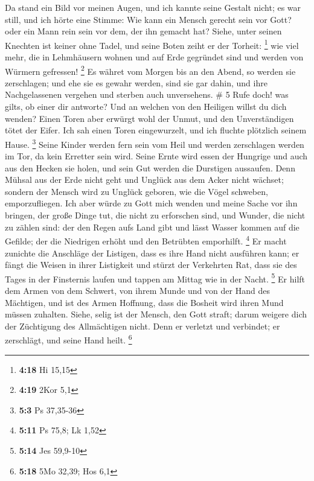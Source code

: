  Da stand ein Bild vor meinen Augen, und ich kannte seine
Gestalt nicht; es war still, und ich hörte eine Stimme: 
Wie kann ein Mensch gerecht sein vor Gott? oder ein Mann rein sein vor
dem, der ihn gemacht hat?  Siehe, unter seinen Knechten ist
keiner ohne Tadel, und seine Boten zeiht er der Torheit: \footnote{\textbf{4:18}
  Hi 15,15}  wie viel mehr, die in Lehmhäusern wohnen und
auf Erde gegründet sind und werden von Würmern gefressen! \footnote{\textbf{4:19}
  2Kor 5,1}  Es währet vom Morgen bis an den Abend, so
werden sie zerschlagen; und ehe sie es gewahr werden, sind sie gar
dahin,  und ihre Nachgelassenen vergehen und sterben auch
unversehens. \# 5  Rufe doch! was gilts, ob einer dir
antworte? Und an welchen von den Heiligen willst du dich wenden?
 Einen Toren aber erwürgt wohl der Unmut, und den
Unverständigen tötet der Eifer.  Ich sah einen Toren
eingewurzelt, und ich fluchte plötzlich seinem Hause. \footnote{\textbf{5:3}
  Ps 37,35-36}  Seine Kinder werden fern sein vom Heil und
werden zerschlagen werden im Tor, da kein Erretter sein wird.
 Seine Ernte wird essen der Hungrige und auch aus den Hecken
sie holen, und sein Gut werden die Durstigen aussaufen. 
Denn Mühsal aus der Erde nicht geht und Unglück aus dem Acker nicht
wächset;  sondern der Mensch wird zu Unglück geboren, wie
die Vögel schweben, emporzufliegen.  Ich aber würde zu Gott
mich wenden und meine Sache vor ihn bringen,  der große
Dinge tut, die nicht zu erforschen sind, und Wunder, die nicht zu zählen
sind:  der den Regen aufs Land gibt und lässt Wasser kommen
auf die Gefilde;  der die Niedrigen erhöht und den
Betrübten emporhilft. \footnote{\textbf{5:11} Ps 75,8; Lk 1,52}
 Er macht zunichte die Anschläge der Listigen, dass es ihre
Hand nicht ausführen kann;  er fängt die Weisen in ihrer
Listigkeit und stürzt der Verkehrten Rat,  dass sie des
Tages in der Finsternis laufen und tappen am Mittag wie in der Nacht.
\footnote{\textbf{5:14} Jes 59,9-10}  Er hilft dem Armen
von dem Schwert, von ihrem Munde und von der Hand des Mächtigen,
 und ist des Armen Hoffnung, dass die Bosheit wird ihren
Mund müssen zuhalten.  Siehe, selig ist der Mensch, den
Gott straft; darum weigere dich der Züchtigung des Allmächtigen nicht.
 Denn er verletzt und verbindet; er zerschlägt, und seine
Hand heilt. \footnote{\textbf{5:18} 5Mo 32,39; Hos 6,1} 
